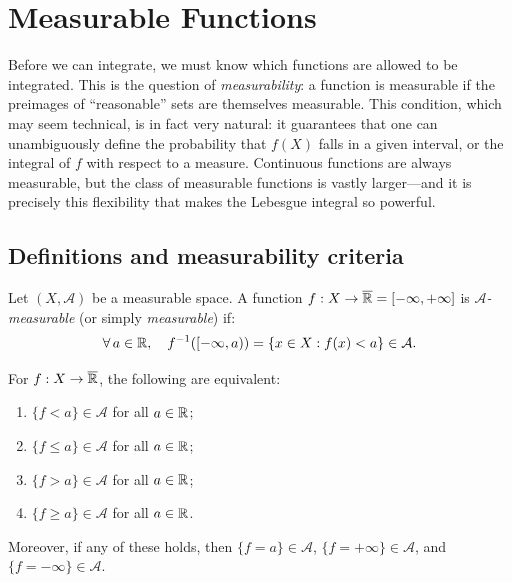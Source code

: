 \chapter{Measurable Functions}
\label{ch:measurable_functions}

Before we can integrate, we must know which functions are allowed to be integrated. This is the question of \emph{measurability}: a function is measurable if the preimages of ``reasonable'' sets are themselves measurable. This condition, which may seem technical, is in fact very natural: it guarantees that one can unambiguously define the probability that $f(X)$ falls in a given interval, or the integral of $f$ with respect to a measure. Continuous functions are always measurable, but the class of measurable functions is vastly larger---and it is precisely this flexibility that makes the Lebesgue integral so powerful.

\section{Definitions and measurability criteria}

\begin{definition}
Let $(X, \mathcal{A})$ be a measurable space. A function
$f : X \to \overline{\mathbb{R}} = [-\infty, +\infty]$ is \emph{$\mathcal{A}$-measurable}
(or simply \emph{measurable}) if:
\[
\forall\, a \in \mathbb{R}, \quad f^{-1}([-\infty, a)) = \{x \in X : f(x) < a\} \in
\mathcal{A}.
\]
\end{definition}

\begin{proposition}
\label{prop:measurability_criteria}
For $f : X \to \overline{\mathbb{R}}$, the following are equivalent:
\begin{enumerate}
    \item $\{f < a\} \in \mathcal{A}$ for all $a \in \mathbb{R}$;
    \item $\{f \leq a\} \in \mathcal{A}$ for all $a \in \mathbb{R}$;
    \item $\{f > a\} \in \mathcal{A}$ for all $a \in \mathbb{R}$;
    \item $\{f \geq a\} \in \mathcal{A}$ for all $a \in \mathbb{R}$.
\end{enumerate}
Moreover, if any of these holds, then $\{f = a\} \in \mathcal{A}$,
$\{f = +\infty\} \in \mathcal{A}$, and $\{f = -\infty\} \in \mathcal{A}$.
\end{proposition}

